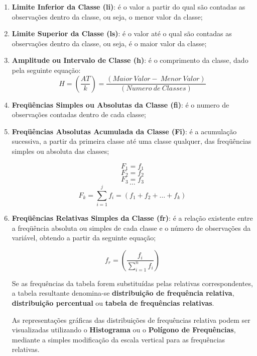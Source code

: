 \begin{enumerate}
Se o número de elementos $n < 25$  utiliza-se o número de classes $k= 5$, se o número de componentes for
$n \geq 25$  utiliza-se o número de classe $k=\sqrt{n}$.
  \item \textbf{Limite Inferior da Classe (li)}: é o valor a partir do qual são contadas as observações dentro da classe, ou seja, o menor valor da classe;
  \item \textbf{Limite Superior da Classe (ls)}: é o valor até o qual são contadas as observações dentro da classe, ou seja, é o maior valor da classe;
  \item \textbf{Amplitude ou Intervalo de Classe (h)}: é o comprimento da classe, dado pela seguinte equação:
      \begin{equation}\label{}
        H= \left( \frac{AT}{k} \right) = \frac{(Maior \ Valor - \ Menor \ Valor)}{(Numero \ de \ Classes)}
      \end{equation}
  \item \textbf{Freqüências Simples ou Absolutas da Classe (fi)}: é o numero de observações contadas dentro de cada classe;
  \item \textbf{Freqüências Absolutas Acumulada da Classe (Fi)}: é a acumulação sucessiva, a partir da primeira classe até uma classe qualquer, das freqüências simples ou absoluta das classes;


      $$ F_{1}= f_{1} $$
      $$ F_{2}= f_{2} $$
      $$ F_{3}= f_{3} $$
      $$ \ldots  $$
      $$ F_{k}=  \sum_{i=1}^{j}f_{i} = (f_{1}+f_{2}+\ldots+ f_{k})$$


\item \textbf{Freqüências Relativas Simples da Classe (fr)}: é a relação existente entre a freqüência absoluta ou simples de cada classe e o número de observações da variável, obtendo a partir da seguinte equação;

\begin{equation}\label{}
f_{r} = \left( \frac{f_{i}}{\sum_{i=1}^{n}f_{i}} \right)
\end{equation}

Se as frequências da tabela forem substituídas pelas relativas correspondentes, a tabela resultante denomina-se \textbf{distribuição de frequência relativa}, \textbf{distribuição percentual} ou \textbf{tabela de frequências relativas}.\vskip0.3cm

As representações gráficas das distribuições de frequências relativa podem ser visualizadas utilizando o \textbf{Histograma} ou o \textbf{Polígono de Frequências}, mediante a simples modificação da escala vertical para as frequências relativas.




\end{enumerate}
